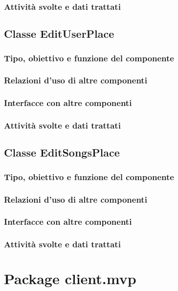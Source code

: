 \subsubsection*{Attivit\`a svolte e dati trattati}

\subsection{Classe EditUserPlace}
\subsubsection*{Tipo, obiettivo e funzione del componente}
\subsubsection*{Relazioni d'uso di altre componenti}
\subsubsection*{Interfacce con altre componenti}
\subsubsection*{Attivit\`a svolte e dati trattati}

\subsection{Classe EditSongsPlace}
\subsubsection*{Tipo, obiettivo e funzione del componente}
\subsubsection*{Relazioni d'uso di altre componenti}
\subsubsection*{Interfacce con altre componenti}
\subsubsection*{Attivit\`a svolte e dati trattati}

\newpage
\section{Package client.mvp} %
